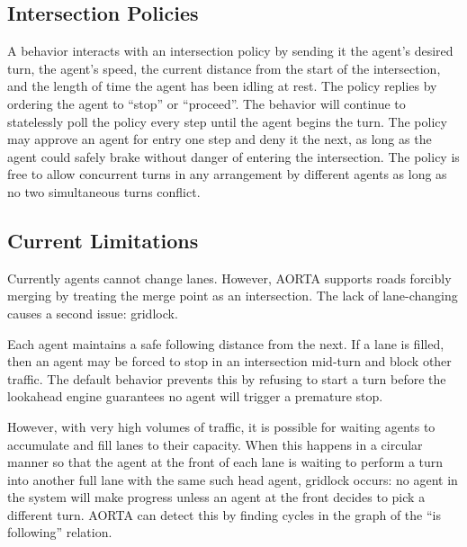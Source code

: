 \documentclass[letterpaper, 10 pt, conference]{ieeeconf}  %
\begin{document}
\subsection{Intersection Policies}

A behavior interacts with an intersection policy by sending it the agent's
desired turn, the agent's speed, the current distance from the start of the
intersection, and the length of time the agent has been idling at rest. The
policy replies by ordering the agent to ``stop'' or ``proceed''. The behavior
will continue to statelessly poll the policy every step until the agent begins
the turn. The policy may approve an agent for entry one step and deny it the
next, as long as the agent could safely brake without danger of entering the
intersection. The policy is free to allow concurrent turns in any arrangement by
different agents as long as no two simultaneous turns conflict.

\subsection{Current Limitations}

Currently agents cannot change lanes. However, AORTA supports roads forcibly
merging by treating the merge point as an intersection. The lack of
lane-changing causes a second issue: gridlock.

Each agent maintains a safe following distance from the next. If a lane is
filled, then an agent may be forced to stop in an intersection mid-turn and
block other traffic. The default behavior prevents this by refusing to start a
turn before the lookahead engine guarantees no agent will trigger a premature
stop.

However, with very high volumes of traffic, it is possible for waiting agents to
accumulate and fill lanes to their capacity. When this happens in a circular
manner so that the agent at the front of each lane is waiting to perform a turn
into another full lane with the same such head agent, gridlock \cite{AAAI11-au}
occurs: no agent in the system will make progress unless an agent at the front
decides to pick a different turn.  AORTA can detect this by finding cycles in
the graph of the ``is following'' relation.
\end{document}
